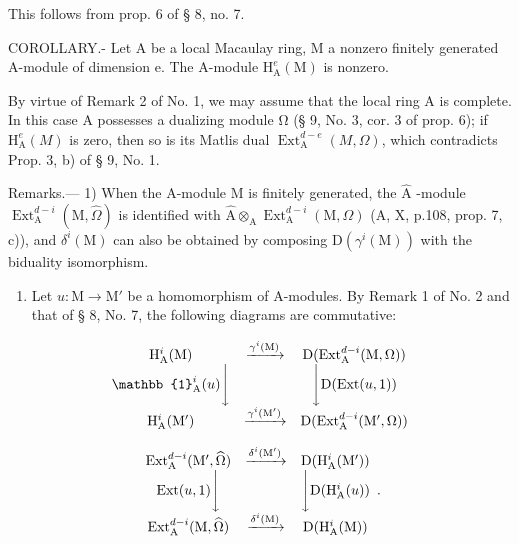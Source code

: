 This follows from prop. 6 of § 8, no. 7.

COROLLARY.- Let A be a local Macaulay ring, M a nonzero finitely generated A-module of dimension e. The A-module \(\mathrm{H}_{\mathrm{A}}^{e}(\mathrm{M})\) is nonzero.

By virtue of Remark 2 of No. 1, we may assume that the local ring A is complete. In this case A possesses a dualizing module Ω (§ 9, No. 3, cor. 3 of prop. 6); if \(\mathrm{H}_{\mathrm{A}}^{e}(M)\) is zero, then so is its Matlis dual \(\operatorname{Ext}_{\mathrm{A}}^{d-e}(M, \Omega)\), which contradicts Prop. 3, b) of § 9, No. 1.

Remarks.--- 1) When the A-module M is finitely generated, the \(\widehat{\mathrm{A}}\) -module \(\operatorname{Ext}_{\mathrm{A}}^{d-i}(\mathrm{M}, \widehat{\Omega})\) is identified with \(\widehat{\mathrm{A}} \otimes_{\mathrm{A}} \operatorname{Ext}_{\mathrm{A}}^{d-i}(\mathrm{M}, \Omega)\) (A, X, p.108, prop. 7, c)), and \(\delta^{i}(\mathrm{M})\) can also be obtained by composing \(\mathrm{D}(\gamma^{i}(\mathrm{M}))\) with the biduality isomorphism.

\begin{enumerate}
\def\labelenumi{\arabic{enumi})}
\setcounter{enumi}{1}
\tightlist
\item
  Let \(u: \mathrm{M} \to \mathrm{M}'\) be a homomorphism of A-modules. By Remark 1 of No. 2 and that of § 8, No. 7, the following diagrams are commutative:
\end{enumerate}

\[
\begin{array}{c c c} \mathrm{H} _ {\mathrm{A}} ^ {i} (\mathrm{M}) & \xrightarrow {\gamma^ {i} (\mathrm{M})} & \mathrm{D} (\mathrm{Ext} _ {\mathrm{A}} ^ {d - i} (\mathrm{M}, \Omega)) \\ \mathbb {1} _ {\mathrm{A}} ^ {i} (u) \Bigg \downarrow & & \Bigg \downarrow \mathrm{D} (\mathrm{Ext} (u, 1)) \\ \mathrm{H} _ {\mathrm{A}} ^ {i} (\mathrm{M} ^ {\prime}) & \xrightarrow {\gamma^ {i} (\mathrm{M} ^ {\prime})} & \mathrm{D} (\mathrm{Ext} _ {\mathrm{A}} ^ {d - i} (\mathrm{M} ^ {\prime}, \Omega)) \end{array}
\]

\[
\begin{array}{c c c} \operatorname{Ext} _ {\mathrm{A}} ^ {d - i} (\mathrm{M} ^ {\prime}, \widehat {\Omega}) & \xrightarrow {\delta^ {i} (\mathrm{M} ^ {\prime})} & \mathrm{D} (\mathrm{H} _ {\mathrm{A}} ^ {i} (\mathrm{M} ^ {\prime})) \\ \operatorname{Ext} (u, 1) \Bigg \downarrow & & \Bigg \downarrow \mathrm{D} (\mathrm{H} _ {\mathrm{A}} ^ {i} (u)) \\ \operatorname{Ext} _ {\mathrm{A}} ^ {d - i} (\mathrm{M}, \widehat {\Omega}) & \xrightarrow {\delta^ {i} (\mathrm{M})} & \mathrm{D} (\mathrm{H} _ {\mathrm{A}} ^ {i} (\mathrm{M})) \end{array} .
\]


